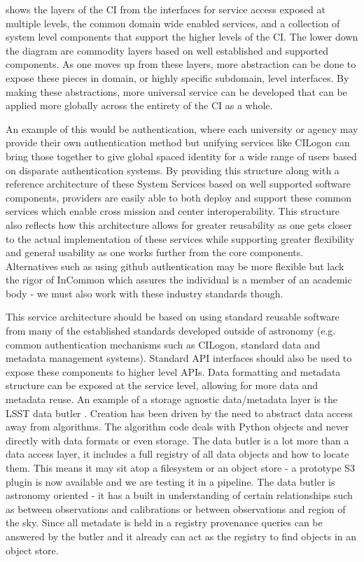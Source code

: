  shows the
layers of the \gls{CI} from the interfaces for service access exposed
at multiple levels, the common domain wide enabled services, and a collection of system level components that support the
higher levels of the \gls{CI}.
The lower down the diagram are commodity layers based on well established and supported
components. As one moves up from these layers, more abstraction can be done to
expose these pieces in domain, or highly specific subdomain, level interfaces. By making these
abstractions, more universal service can be developed that can be applied more globally
across the entirety of the \gls{CI} as a whole.

An example of this would be
authentication, where each university or agency may provide their own authentication method
but unifying services like CILogon can bring those together to give global spaced
identity for a wide range of users based on disparate authentication systems.
By providing this structure along with a reference architecture of these System Services based on
well supported software components, providers are easily able to both deploy and support these common services which enable
cross mission and center interoperability. This structure also reflects how this architecture allows for greater reusability as one gets closer to the actual implementation of these
services while supporting greater flexibility and general usability as one works further from the core components.
Alternatives such as using github authentication may be more flexible but lack the 
 rigor of InCommon which assures the individual is a member of an academic body - we must also work with these industry standards though.

This service architecture should be based on using standard reusable software from many of the established standards developed outside of astronomy (e.g. common authentication mechanisms such as CILogon, standard data and \gls{metadata} management systems).  Standard \gls{API} interfaces should also be used to expose these components to higher level \gls{API}s. Data
formatting and \gls{metadata} structure can be exposed at the service level, allowing for
more data and \gls{metadata} reuse.
 An example of a storage agnostic data/metadata layer is the \gls{LSST} data butler \citep{2018arXiv181208085J}. Creation  has been driven by the need to abstract data access away from algorithms.
The \gls{algorithm} code deals with Python objects and never directly with data formats or even storage. The data butler is a lot more than a data access layer, it includes a full registry of all data objects and how to locate them. This means it may sit atop a filesystem or an object store - a prototype S3 plugin is now available and we are testing it in a \gls{pipeline}.  The data butler is astronomy oriented - it has a built in understanding of certain relationships such as between observations and calibrations or between observations and region of the sky. Since all metadate is held in a registry \gls{provenance} queries can be answered by the butler and it already can act as the registry to find objects in an object store.



